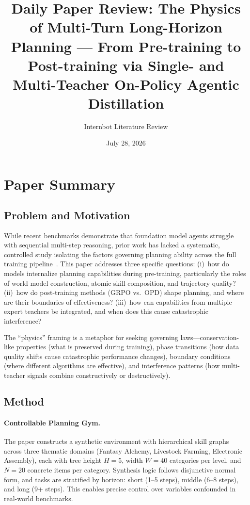 \documentclass[11pt,a4paper]{article}
\title{Daily Paper Review: The Physics of Multi-Turn Long-Horizon Planning --- From Pre-training to Post-training via Single- and Multi-Teacher On-Policy Agentic Distillation}
\author{Internbot Literature Review}
\date{July 28, 2026}
\begin{document}
\maketitle

\section{Paper Summary}

\subsection{Problem and Motivation}

While recent benchmarks demonstrate that foundation model agents struggle with sequential multi-step reasoning, prior work has lacked a systematic, controlled study isolating the factors governing planning ability across the full training pipeline~\cite{men2026physics}. This paper addresses three specific questions: (i)~how do models internalize planning capabilities during pre-training, particularly the roles of world model construction, atomic skill composition, and trajectory quality? (ii)~how do post-training methods (GRPO vs.\ OPD) shape planning, and where are their boundaries of effectiveness? (iii)~how can capabilities from multiple expert teachers be integrated, and when does this cause catastrophic interference?

The ``physics'' framing is a metaphor for seeking governing laws---conservation-like properties (what is preserved during training), phase transitions (how data quality shifts cause catastrophic performance changes), boundary conditions (where different algorithms are effective), and interference patterns (how multi-teacher signals combine constructively or destructively).

\subsection{Method}

\paragraph{Controllable Planning Gym.}
The paper constructs a synthetic environment with hierarchical skill graphs across three thematic domains (Fantasy Alchemy, Livestock Farming, Electronic Assembly), each with tree height $H=5$, width $W=40$ categories per level, and $N=20$ concrete items per category. Synthesis logic follows disjunctive normal form, and tasks are stratified by horizon: short (1--5 steps), middle (6--8 steps), and long (9+ steps). This enables precise control over variables confounded in real-world benchmarks.
\end{document}

